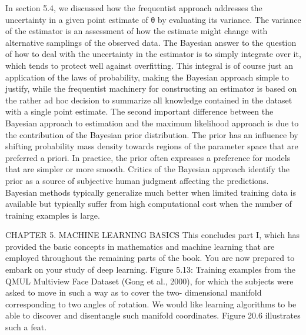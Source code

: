 \documentclass[11pt]{article}
\begin{document}
In section 5.4, we discussed how the frequentist approach addresses the uncertainty in a given point estimate of θ by evaluating its variance.
The variance of the estimator is an assessment of how the estimate might change with alternative samplings of the observed data.
The Bayesian answer to the question of how to deal with the uncertainty in the estimator is to simply integrate over it, which tends to protect well against overﬁtting.
This integral is of course just an application of the laws of probability, making the Bayesian approach simple to justify, while the frequentist machinery for constructing an estimator is based on the rather ad hoc decision to summarize all knowledge contained in the dataset with a single point estimate.
The second important diﬀerence between the Bayesian approach to estimation and the maximum likelihood approach is due to the contribution of the Bayesian prior distribution.
The prior has an inﬂuence by shifting probability mass density towards regions of the parameter space that are preferred a priori.
In practice, the prior often expresses a preference for models that are simpler or more smooth.
Critics of the Bayesian approach identify the prior as a source of subjective human judgment aﬀecting the predictions.
Bayesian methods typically generalize much better when limited training data
is available but typically suﬀer from high computational cost when the number of
training examples is large.

CHAPTER 5.
MACHINE LEARNING BASICS
This concludes part I, which has provided the basic concepts in mathematics and machine learning that are employed throughout the remaining parts of the book.
You are now prepared to embark on your study of deep learning.
Figure 5.13: Training examples from the QMUL Multiview Face Dataset (Gong et al.,
2000), for which the subjects were asked to move in such a way as to cover the two-
dimensional manifold corresponding to two angles of rotation.
We would like learning algorithms to be able to discover and disentangle such manifold coordinates.
Figure 20.6 illustrates such a feat.
\end{document}
